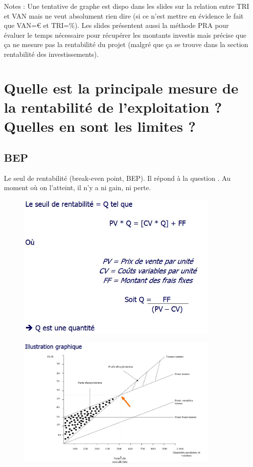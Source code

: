 \documentclass{article}
\begin{document}
Notes : 
Une tentative de graphe est dispo dans les slides sur la relation entre TRI et VAN mais ne veut absolument rien dire (si ce n'est mettre en évidence le fait que VAN=\euro{} et TRI=\%).
Les slides présentent aussi la méthode PRA pour évaluer le temps nécessaire pour récupérer les montants investis mais précise que ça ne mesure pas la rentabilité du projet (malgré que ça se trouve dans la section rentabilité des investissements).

\section{Quelle est la principale mesure de la rentabilité de l’exploitation ? Quelles en sont les limites ?}

\subsection{BEP}
Le seul de rentabilité (break-even point, BEP). Il répond à la question . Au moment où on l'atteint, il n'y a ni gain, ni perte.

\begin{figure}[H]
	\includegraphics[width=10cm]{bep.jpg}
\end{figure}

\begin{figure}[H]
	\centering
	\includegraphics[width=10cm]{bep-graphe.jpg}
\end{figure}
\end{document}

